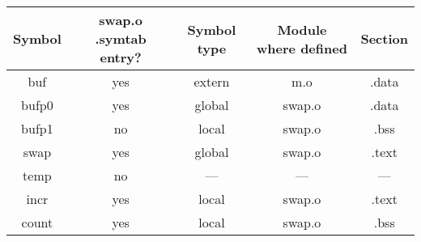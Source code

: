 \documentclass{article}
\begin{document}
\begin{tabular}{c c c c c}
Symbol & swap.o .symtab entry? & Symbol type & Module where defined & Section \\
\hline
buf & yes & extern & m.o & .data \\
bufp0 & yes & global & swap.o & .data \\
bufp1 & no & local & swap.o & .bss \\
swap & yes & global & swap.o & .text \\
temp & no & --- & --- & --- \\
incr & yes & local & swap.o & .text \\
count & yes & local & swap.o & .bss \\	
\end{tabular}
\end{document}
